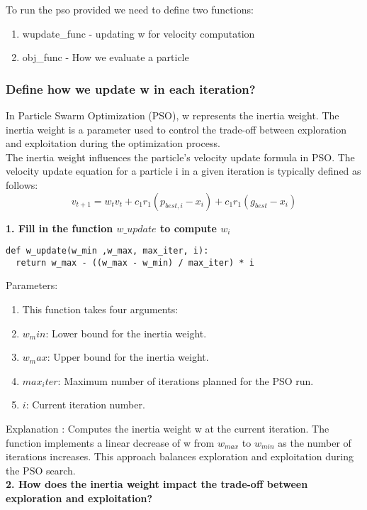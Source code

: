 \documentclass[letterpaper, 12pt]{article}
\begin{document}
To run the pso provided we need to define two functions:

\begin{enumerate}
    \item wupdate\_func - updating w for velocity computation
    \item obj\_func - How we evaluate a particle
\end{enumerate}

\subsubsection*{Define how we update w in each iteration?} 
In Particle Swarm Optimization (PSO), w represents the inertia weight. The inertia weight is a parameter used to control the trade-off between exploration and exploitation during the optimization process.\\

The inertia weight influences the particle's velocity update formula in PSO. The velocity update equation for a particle i in a given iteration is typically defined as follows:
 \[v_{t+1} = w_{t}v_{t} + c_1  r_1(p_{best,i} - x_i) +c_1 r_1 (g_{best} - x_i)\]
 \newpage
 
\textbf{1. Fill in the function $w\_update$ to compute $w_i$} \\
\begin{lstlisting}
def w_update(w_min ,w_max, max_iter, i):
  return w_max - ((w_max - w_min) / max_iter) * i
\end{lstlisting}
Parameters:
\begin{enumerate}
    \item This function takes four arguments:
    \item $w_min$: Lower bound for the inertia weight.
    \item $w_max$: Upper bound for the inertia weight.
    \item $max_iter$: Maximum number of iterations planned for the PSO run.
    \item $i$: Current iteration number.
\end{enumerate}
Explanation : Computes the inertia weight w at the current iteration. The function implements a linear decrease of w from $w_{max}$ to $w_{min}$ as the number of iterations increases. This approach balances exploration and exploitation during the PSO search.\\


\textbf{2. How does the inertia weight impact the trade-off between exploration and exploitation?} \\
\end{document}
